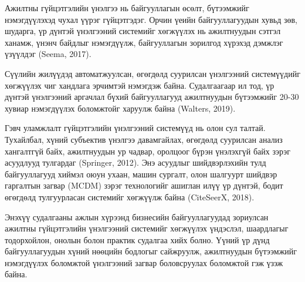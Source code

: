 Ажилтны гүйцэтгэлийн үнэлгээ нь байгууллагын өсөлт, бүтээмжийг нэмэгдүүлэхэд чухал үүрэг гүйцэтгэдэг. Орчин үеийн байгууллагуудын хувьд зөв, шударга, үр дүнтэй үнэлгээний системийг хөгжүүлэх нь ажилтнуудын сэтгэл ханамж, үнэнч байдлыг нэмэгдүүлж, байгууллагын зорилгод хүрэхэд дэмжлэг үзүүлдэг (Seema, 2017).

Сүүлийн жилүүдэд автоматжуулсан, өгөгдөлд суурилсан үнэлгээний системүүдийг хөгжүүлэх чиг хандлага эрчимтэй нэмэгдэж байна. Судалгаагаар ил тод, үр дүнтэй үнэлгээний аргачлал бүхий байгууллагууд ажилтнуудын бүтээмжийг 20-30 хувиар нэмэгдүүлэх боломжтойг харуулж байна (Walters, 2019).

Гэвч уламжлалт гүйцэтгэлийн үнэлгээний системүүд нь олон сул талтай. Тухайлбал, хүний субъектив үнэлгээ давамгайлах, өгөгдөлд суурилсан анализ хангалтгүй байх, ажилтнуудын ур чадвар, оролцоог бүрэн үнэлэхгүй байх зэрэг асуудлууд тулгардаг (Springer, 2012). Энэ асуудлыг шийдвэрлэхийн тулд байгууллагууд хиймэл оюун ухаан, машин сургалт, олон шалгуурт шийдвэр гаргалтын загвар (MCDM) зэрэг технологийг ашиглан илүү үр дүнтэй, бодит өгөгдөлд тулгуурласан системийг хөгжүүлж байна (CiteSeerX, 2018).

Энэхүү судалгааны ажлын хүрээнд бизнесийн байгууллагуудад зориулсан ажилтны гүйцэтгэлийн үнэлгээний системийг хөгжүүлэх үндэслэл, шаардлагыг тодорхойлон, онолын болон практик судалгаа хийх болно. Үүний үр дүнд байгууллагуудын хүний нөөцийн бодлогыг сайжруулж, ажилтнуудын бүтээмжийг нэмэгдүүлэх боломжтой үнэлгээний загвар боловсруулах боломжтой гэж үзэж байна.